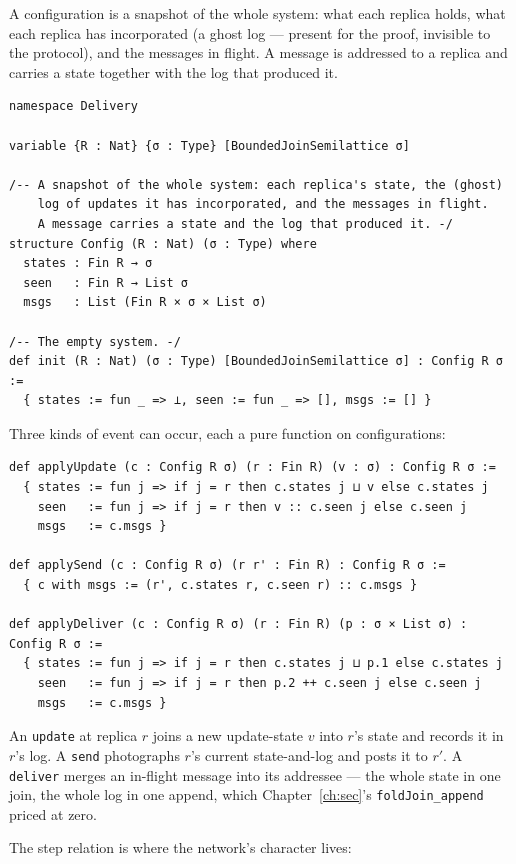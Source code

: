 \documentclass[12pt, a4paper, openright]{book}
\theoremstyle{thmstyle}
\theoremstyle{defstyle}
\newcommand{\lc}[1]{\texttt{#1}}
\begin{document}
A configuration is a snapshot of the whole system: what each replica
holds, what each replica has incorporated (a ghost log --- present for the
proof, invisible to the protocol), and the messages in flight. A message
is addressed to a replica and carries a state together with the log that
produced it.

\begin{verbatim}
namespace Delivery

variable {R : Nat} {σ : Type} [BoundedJoinSemilattice σ]

/-- A snapshot of the whole system: each replica's state, the (ghost)
    log of updates it has incorporated, and the messages in flight.
    A message carries a state and the log that produced it. -/
structure Config (R : Nat) (σ : Type) where
  states : Fin R → σ
  seen   : Fin R → List σ
  msgs   : List (Fin R × σ × List σ)

/-- The empty system. -/
def init (R : Nat) (σ : Type) [BoundedJoinSemilattice σ] : Config R σ :=
  { states := fun _ => ⊥, seen := fun _ => [], msgs := [] }
\end{verbatim}

Three kinds of event can occur, each a pure function on configurations:

\begin{verbatim}
def applyUpdate (c : Config R σ) (r : Fin R) (v : σ) : Config R σ :=
  { states := fun j => if j = r then c.states j ⊔ v else c.states j
    seen   := fun j => if j = r then v :: c.seen j else c.seen j
    msgs   := c.msgs }

def applySend (c : Config R σ) (r r' : Fin R) : Config R σ :=
  { c with msgs := (r', c.states r, c.seen r) :: c.msgs }

def applyDeliver (c : Config R σ) (r : Fin R) (p : σ × List σ) : Config R σ :=
  { states := fun j => if j = r then c.states j ⊔ p.1 else c.states j
    seen   := fun j => if j = r then p.2 ++ c.seen j else c.seen j
    msgs   := c.msgs }
\end{verbatim}

An \lc{update} at replica $r$ joins a new update-state $v$ into $r$'s
state and records it in $r$'s log. A \lc{send} photographs $r$'s current
state-and-log and posts it to $r'$. A \lc{deliver} merges an in-flight
message into its addressee --- the whole state in one join, the whole log
in one append, which Chapter~\ref{ch:sec}'s \lc{foldJoin_append} priced
at zero.

The step relation is where the network's character lives:
\end{document}
